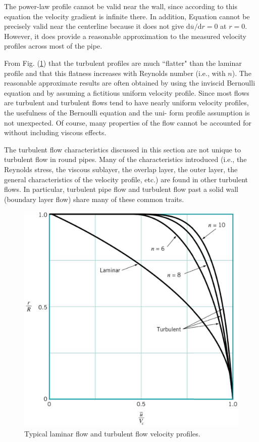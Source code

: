 \documentclass[12pt,a4paper]{article}
\newcommand{\dif}{\mathrm{d}}
\begin{document}
The power-law profile cannot be valid near the wall, since according to this equation the velocity gradient is infinite there. In addition, Equation cannot be precisely valid near the centerline because it does not give $\dif \overline{u}/\dif r = 0$ at $r = 0$. However, it does provide a reasonable approximation to the measured velocity profiles across most of the pipe.

From Fig. (\ref{fig:velocity_profiles}) that the turbulent profiles are much ``flatter" than the laminar profile and that this flatness increases with Reynolds number (i.e., with $n$). The reasonable approximate results are often obtained by using the inviscid Bernoulli equation and by assuming a fictitious uniform velocity profile. Since most flows are turbulent and turbulent flows tend to have nearly uniform velocity profiles, the usefulness of the Bernoulli equation and the uni- form profile assumption is not unexpected. Of course, many properties of the flow cannot be accounted for without including viscous effects.

The turbulent flow characteristics discussed in this section are not unique to turbulent flow in round pipes. Many of the characteristics introduced (i.e., the Reynolds stress, the viscous sublayer, the overlap layer, the outer layer, the general characteristics of the velocity profile, etc.) are found in other turbulent flows. In particular, turbulent pipe flow and turbulent flow past a solid wall (boundary layer flow) share many of these common traits.

\begin{figure}
\centering
\includegraphics[height=10.cm, angle=0]{velocity_profiles.eps}
\caption{
Typical laminar flow and turbulent flow velocity profiles.
}
\label{fig:velocity_profiles}
\end{figure}
\end{document}

